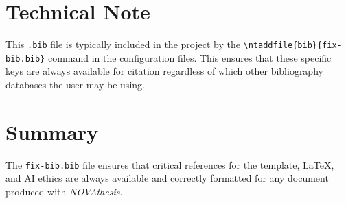 \section{Technical Note}
This \texttt{.bib} file is typically included in the project by the \texttt{\textbackslash ntaddfile\{bib\}\{fix-bib.bib\}} command in the configuration files. This ensures that these specific keys are always available for citation regardless of which other bibliography databases the user may be using.

\section{Summary}
The \texttt{fix-bib.bib} file ensures that critical references for the template, \LaTeX, and AI ethics are always available and correctly formatted for any document produced with \emph{NOVAthesis}.
